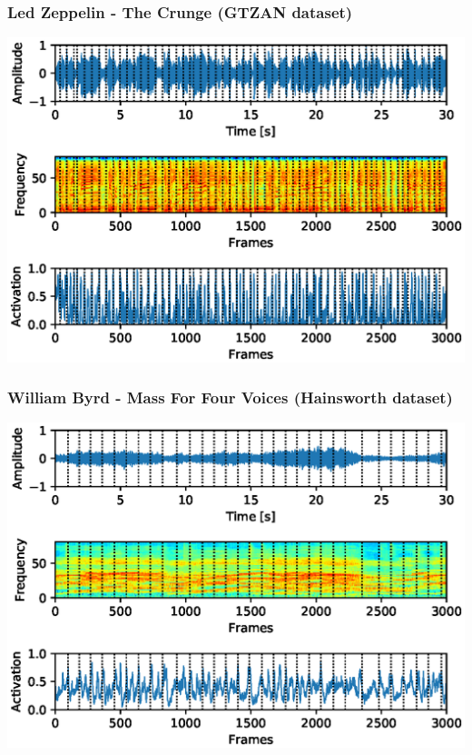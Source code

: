 \documentclass{beamer}
\begin{document}
\begin{frame}
\frametitle{Led Zeppelin - The Crunge (GTZAN dataset)}
\begin{minipage}{\textwidth} 
\centering
\includegraphics[scale=0.6]{figures/led_zeppelin.eps}
\end{minipage}
\end{frame}


\begin{frame}
\frametitle{William Byrd - Mass For Four Voices (Hainsworth dataset)}
\begin{minipage}{\textwidth} 
\centering
\includegraphics[scale=0.6]{figures/Tallis_Scholars.eps}
\end{minipage}
\end{frame}
\end{document}
